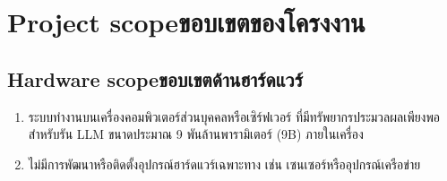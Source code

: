 \section{\ifenglish Project scope\else ขอบเขตของโครงงาน\fi}

\subsection{\ifenglish Hardware scope\else ขอบเขตด้านฮาร์ดแวร์\fi}
\begin{enumerate}
    \item ระบบทำงานบนเครื่องคอมพิวเตอร์ส่วนบุคคลหรือเซิร์ฟเวอร์
          ที่มีทรัพยากรประมวลผลเพียงพอสำหรับรัน LLM ขนาดประมาณ
          9 พันล้านพารามิเตอร์ (9B) ภายในเครื่อง
    \item ไม่มีการพัฒนาหรือติดตั้งอุปกรณ์ฮาร์ดแวร์เฉพาะทาง
          เช่น เซนเซอร์หรืออุปกรณ์เครือข่าย
\end{enumerate}

